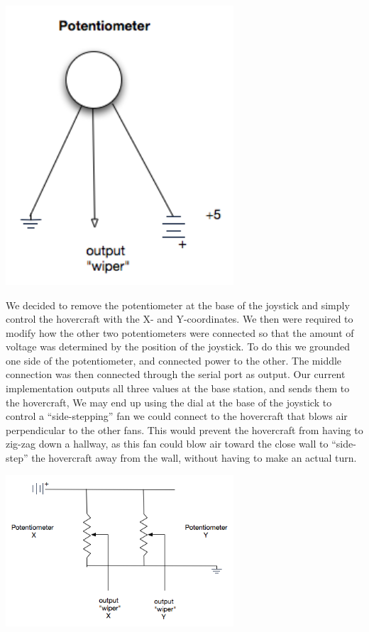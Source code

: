 \begin{center}
  \includegraphics[width=85mm]{imageSources/joystickPotentiometer.png}
\end{center}
\label{joystickPotentiometer}

We decided to remove the potentiometer at the base of the joystick and simply control the hovercraft with the X- and Y-coordinates. We then were required to modify how the other two potentiometers were connected so that the amount of voltage was determined by the position of the joystick. To do this we grounded one side of the potentiometer, and connected power to the other. The middle connection was then connected through the serial port as output. Our current implementation outputs all three values at the base station, and sends them to the hovercraft, We may end up using the dial at the base of the joystick to control a ``side-stepping'' fan we could connect to the hovercraft that blows air perpendicular to the other fans. This would prevent the hovercraft from having to zig-zag down a hallway, as this fan could blow air toward the close wall to ``side-step'' the hovercraft away from the wall, without having to make an actual turn.

\begin{center}
  \includegraphics[width=85mm]{imageSources/potentiometerSchematic.png}
\end{center}
\label{potentiometerSchematic}

